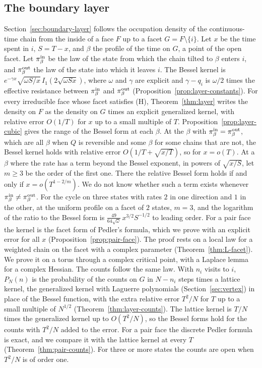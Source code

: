 \subsection{The boundary layer}\label{sec:intro-layer}

Section~\ref{sec:boundary-layer} follows the occupation density of the
continuous-time chain from the inside of a face $F$ up to a facet
$G=F\setminus\{i\}$. Let $x$ be the time spent in $i$, $S=T-x$, and $\beta$ the
profile of the time on $G$, a point of the open facet. Let $\pi^{\rm in}_\beta$ be
the law of the state from which the chain tilted to $\beta$ enters $i$, and
$\pi^{\rm out}_\beta$ the law of the state into which it leaves $i$. The Bessel
kernel is $e^{-\gamma x}\sqrt{\omega S/x}\,I_1(2\sqrt{\omega Sx})$, where
$\omega$ and $\gamma$ are explicit and $\gamma-q_i$ is $\omega/2$ times the
effective resistance between $\pi^{\rm in}_\beta$ and $\pi^{\rm out}_\beta$
(Proposition~\ref{prop:layer-constants}). For every irreducible face whose
facet satisfies (H), Theorem~\ref{thm:layer} writes the density on $F$ as the
density on $G$ times an explicit generalized kernel, with relative error
$O(1/T)$ for $x$ up to a small multiple of $T$. Proposition~\ref{prop:layer-cubic}
gives the range of the Bessel form at each $\beta$. At the $\beta$ with
$\pi^{\rm in}_\beta=\pi^{\rm out}_\beta$, which are all $\beta$ when $Q$ is
reversible and some $\beta$ for some chains that are not, the Bessel kernel holds
with relative error $O(1/T+\sqrt{x/T})$, so for $x=o(T)$. At a $\beta$ where the
rate has a term beyond the Bessel exponent, in powers of $\sqrt{x/S}$, let $m\ge3$
be the order of the first one. There the relative Bessel form holds if and only
if $x=o(T^{1-2/m})$. We do not know whether such a term exists whenever
$\pi^{\rm in}_\beta\ne\pi^{\rm out}_\beta$. For the cycle on three states with rates
$2$ in one direction and $1$ in the other, at the uniform profile on a facet of
$2$ states, $m=3$, and the logarithm of the ratio
to the Bessel form is $\frac{49}{64\sqrt\omega}\,x^{3/2}S^{-1/2}$ to leading
order. For a pair face the kernel is the facet form of Pedler's formula, which
we prove with an explicit error for all $x$ (Proposition~\ref{prop:pair-face}).
The proof rests on a local law for a weighted chain on the facet with a complex
parameter (Theorem~\ref{thm:L-facet}). We prove it on a torus through a complex
critical point, with a Laplace lemma for a complex Hessian. The counts follow
the same law. With $n_i$ visits to $i$, $P_N(n)$ is the probability of the
counts on $G$ in $N-n_i$ steps times a lattice kernel, the generalized kernel with
Laguerre polynomials\ifarxivbuild{} (Section~\ref{sec:vertex})\fi{} in place of the Bessel
function, with the extra relative error $T^2/N$ for $T$ up to a small multiple of $N^{1/2}$
(Theorem~\ref{thm:layer-counts}). The lattice kernel is $T/N$ times the
generalized kernel up to $O(T^2/N)$, so the Bessel forms hold for the counts with $T^2/N$ added to the error.
For a pair face the discrete Pedler formula is exact, and we compare it with the
lattice kernel at every $T$ (Theorem~\ref{thm:pair-counts}). For three or more
states the counts are open when $T^2/N$ is of order one.

